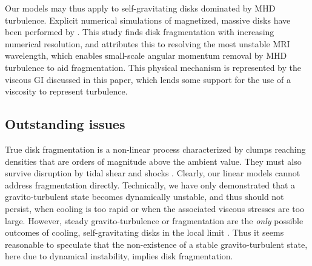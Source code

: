 
Our models may thus apply to self-gravitating disks dominated by MHD
turbulence.     
Explicit numerical simulations of magnetized, massive disks have been performed 
by \cite{fromang05}. This study finds disk fragmentation with increasing numerical
resolution, and attributes this to resolving the most unstable MRI
wavelength, which enables small-scale angular momentum removal by MHD
turbulence to aid fragmentation. %
This physical mechanism is represented by the viscous GI 
discussed in this paper, which lends some support for  
the use of a viscosity to represent turbulence.    


\subsection{Outstanding issues}
True disk fragmentation is a non-linear process characterized by
clumps reaching densities that are orders of magnitude above the
ambient value. They must also survive 
disruption by tidal shear and shocks \citep{shlosman87,young16}.  
Clearly, our linear models cannot address fragmentation
directly. Technically, we have only demonstrated that a 
gravito-turbulent state becomes dynamically unstable, and thus should
not persist, when cooling is too rapid or when the associated viscous
stresses are too large.  However, steady gravito-turbulence or 
fragmentation are the \emph{only} possible outcomes of cooling, 
self-gravitating disks in the local limit \citep[][]{gammie01}.    
Thus it seems reasonable to speculate that the non-existence of a stable
gravito-turbulent state, here due to dynamical instability, implies
disk fragmentation.   

